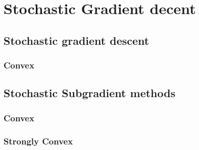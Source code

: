 




\section{Stochastic Gradient decent}



\subsection{Stochastic gradient descent}
\subsubsection{Convex}
\label{sec:convexsmoothsgd}

% 



\subsection{Stochastic Subgradient methods}
\subsubsection{Convex}
\label{sec:sgdcvxnonsmth}


\subsubsection{Strongly Convex}
\label{sec:sgdscvxnonsmth}




